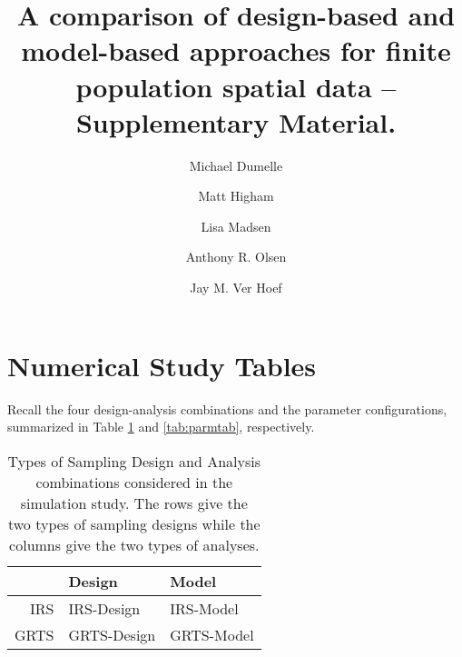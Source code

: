 \documentclass[]{elsarticle} %
\begin{document}
\begin{frontmatter}

  \title{A comparison of design-based and model-based approaches for finite
population spatial data -- Supplementary Material.}
    \author[USEPA]{Michael Dumelle}
    \author[STLAW]{Matt Higham}
    \author[OSU]{Lisa Madsen}
  
    \author[USEPA]{Anthony R. Olsen}
  
    \author[NOAA]{Jay M. Ver Hoef}
  
      \address[USEPA]{United States Environmental Protection Agency, 200 SW 35th St,
Corvallis, Oregon, 97333}
    \address[STLAW]{Saint Lawrence University Department of Mathematics, Computer Science,
and Statistics, 23 Romoda Drive, Canton, New York, 13617}
    \address[OSU]{Oregon State University Department of Statistics, 239 Weniger Hall,
Corvallis, Oregon, 97331}
    \address[NOAA]{Marine Mammal Laboratory, Alaska Fisheries Science Center, National
Oceanic and Atmospheric Administration, Seattle, Washington, 98115}
  
  \begin{abstract}
  
  \end{abstract}
  
 \end{frontmatter}

\hypertarget{sec:numstudy}{%
\section{Numerical Study Tables}\label{sec:numstudy}}

Recall the four design-analysis combinations and the parameter
configurations, summarized in Table \ref{tab:designanalysis} and
\ref{tab:parmtab}, respectively.

\begin{table}[ht]
\centering
\begin{tabular}{r|ll}
  \hline
 & Design & Model \\ 
  \hline
IRS & IRS-Design & IRS-Model \\ 
  GRTS & GRTS-Design & GRTS-Model \\ 
   \hline
\end{tabular}
\caption{\label{tab:designanalysis} Types of Sampling Design and Analysis combinations considered in the simulation study. The rows give the two types of sampling designs while the columns give the two types of analyses.} 
\end{table}
\end{document}
